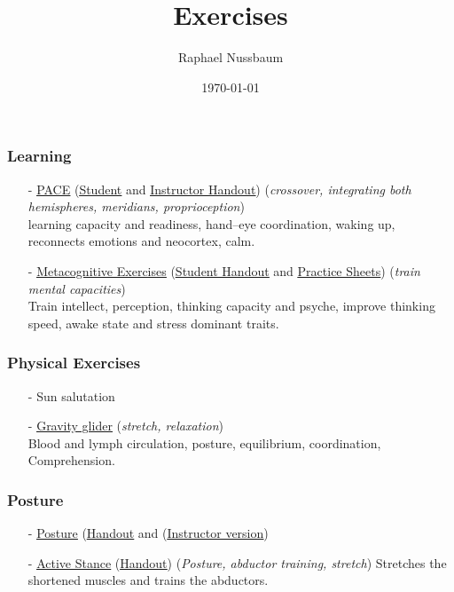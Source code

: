 \documentclass{beamer}
\title{Exercises} %
\author{Raphael Nussbaum} %
\institute[AJ] %
{
AJ Tutoring \\ %
\medskip
\textit{raphaelnussbaum@ajtutoring.com} %
}
\date{\today} %
\begin{document}
\begin{frame}
\titlepage %
\end{frame}

\begin{frame}
\frametitle{Learning}
\begin{itemize}
\item[-] \href{run:./PACE_presentation.pdf}{\underline{PACE}}
(\href{run:./PACE_Handout_student.pdf}{\underline{Student}} and 
\href{run:./PACE_Handout_instructor.pdf}{\underline{Instructor Handout}})
 (\textit{crossover, integrating both hemispheres, meridians, proprioception})\\
 learning capacity and readiness, hand--eye coordination, waking up,  reconnects emotions and neocortex, calm.
 
\item[-] \href{run:./Metacognitive_Instructor.pdf}{\underline{Metacognitive Exercises}} 
(\href{run:./Metacognitive_Student.pdf}{\underline{Student Handout}} and
\href{run:./Metacognitive_Exercises.pdf}{\underline{Practice Sheets}})
 (\textit{train mental capacities})\\
Train intellect, perception, thinking capacity and psyche, improve thinking speed, awake state and stress dominant traits.
 \end{itemize}
\end{frame}
\begin{frame}
\frametitle{Physical Exercises}
\begin{itemize}
\item[-] Sun salutation
\item[-] \href{run:./Gravity_Glider.pdf}{\underline{Gravity glider}} 
 (\textit{stretch, relaxation})\\
Blood and lymph circulation, posture, equilibrium, coordination, \\
Comprehension.
 \end{itemize}
\end{frame}
\begin{frame}
\frametitle{Posture}
\begin{itemize}
\item[-] \href{run:./Posture.pdf}{\underline{Posture}}
(\href{run:./Posture_Handout.pdf}{\underline{Handout}}
and 
(\href{run:./Posture_wNotes.pdf}{\underline{Instructor version}})  
\item[-] 
\href{run:./Active_Stance.pdf}{\underline{Active Stance}}
(\href{run:./Active_Stance_Handout.pdf}{\underline{Handout}}) 
(\textit{Posture, abductor training, stretch})
Stretches the shortened muscles and trains the abductors.


\end{itemize}
\end{frame}
\end{document}
